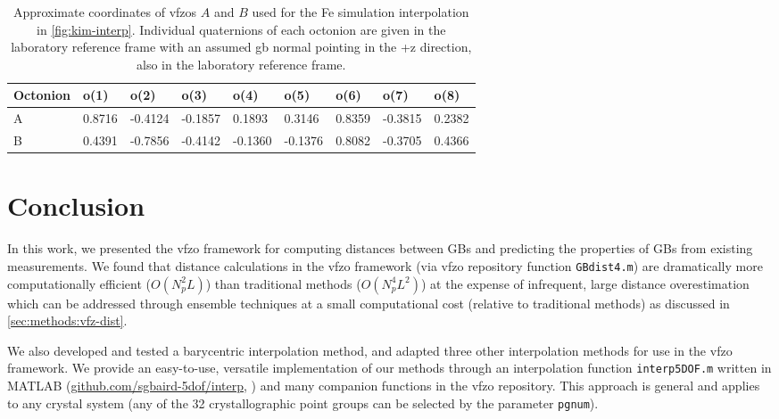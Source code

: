 \documentclass[final,twocolumn,12pt]{elsarticle}
\newcommand{\distfn}{GBdist4}
\newcommand{\vfzorepo}{\gls{vfzo} repository}
\begin{document}
{\begin{table}
\centering
\caption{Approximate coordinates of \glspl{vfzo} $A$ and $B$ used for the Fe simulation interpolation in \cref{fig:kim-interp}. Individual quaternions of each octonion are given in the laboratory reference frame with an assumed \gls{gb} normal pointing in the +z direction, also in the laboratory reference frame.}
\label{tab:tunnel-AB2}
\begin{tabular}{lllllllll}
\hline
Octonion & o(1)   & o(2)    & o(3)    & o(4)    & o(5)    & o(6)   & o(7)    & o(8)   \\ \hline
A        & 0.8716 & -0.4124 & -0.1857 & 0.1893  & 0.3146  & 0.8359 & -0.3815 & 0.2382 \\
B        & 0.4391 & -0.7856 & -0.4142 & -0.1360 & -0.1376 & 0.8082 & -0.3705 & 0.4366 \\ \hline
\end{tabular}
\end{table}

\section{Conclusion} \label{sec:conclusion}

In this work, we presented the \gls{vfzo} framework for computing distances between GBs and predicting the properties of GBs from existing measurements. We found that distance calculations in the \gls{vfzo} framework (via \vfzorepo{} function \texttt{\distfn{}.m}) are dramatically more computationally efficient ($O(N_p^2L)$) than traditional methods ($O(N_p^4L^2)$) at the expense of infrequent, large distance overestimation which can be addressed through ensemble techniques at a small computational cost (relative to traditional methods) as discussed in \cref{sec:methods:vfz-dist}.

We also developed and tested a barycentric interpolation method, and adapted three other interpolation methods for use in the \gls{vfzo} framework. We provide an easy-to-use, versatile implementation of our methods through an interpolation function \texttt{interp5DOF.m} written in MATLAB  (\url{github.com/sgbaird-5dof/interp}, \cite{bairdFiveDegreeofFreedom5DOF2020}) and many companion functions in the \vfzorepo{}.  This approach is general and applies to any crystal system (any of the 32 crystallographic point groups can be selected by the parameter \texttt{pgnum}). 

}
\end{document}
